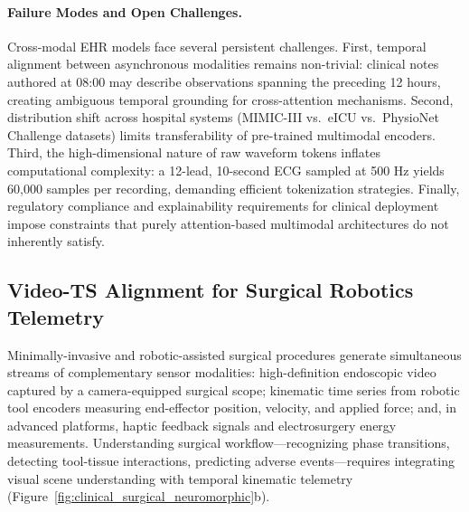 \paragraph{Failure Modes and Open Challenges.}
Cross-modal EHR models face several persistent challenges. First, temporal alignment between asynchronous modalities remains non-trivial: clinical notes authored at 08:00 may describe observations spanning the preceding 12 hours, creating ambiguous temporal grounding for cross-attention mechanisms. Second, distribution shift across hospital systems (MIMIC-III vs.\ eICU vs.\ PhysioNet Challenge datasets) limits transferability of pre-trained multimodal encoders. Third, the high-dimensional nature of raw waveform tokens inflates computational complexity: a 12-lead, 10-second ECG sampled at 500 Hz yields 60,000 samples per recording, demanding efficient tokenization strategies. Finally, regulatory compliance and explainability requirements for clinical deployment impose constraints that purely attention-based multimodal architectures do not inherently satisfy.


\subsection{Video-TS Alignment for Surgical Robotics Telemetry}
\label{sec:surgical_video_ts}

Minimally-invasive and robotic-assisted surgical procedures generate simultaneous streams of complementary sensor modalities: high-definition endoscopic video captured by a camera-equipped surgical scope; kinematic time series from robotic tool encoders measuring end-effector position, velocity, and applied force; and, in advanced platforms, haptic feedback signals and electrosurgery energy measurements. Understanding surgical workflow---recognizing phase transitions, detecting tool-tissue interactions, predicting adverse events---requires integrating visual scene understanding with temporal kinematic telemetry (Figure~\ref{fig:clinical_surgical_neuromorphic}b).

